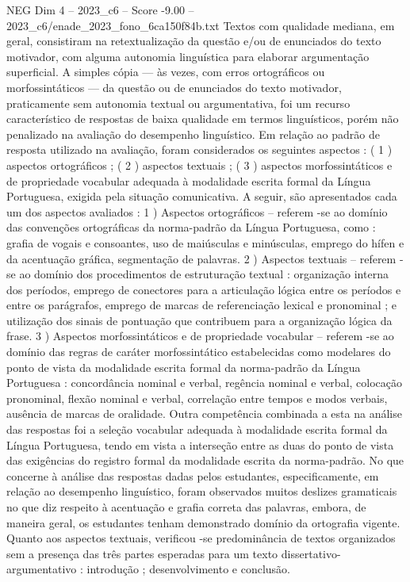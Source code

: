 \begin{textsample}{NEG Dim 4 – 2023\_c6 – Score -9.00 – 2023\_c6/enade\_2023\_fono\_6ca150f84b.txt}
Textos com qualidade mediana, em geral, consistiram na retextualização da questão e/ou de enunciados do texto motivador, com alguma autonomia linguística para elaborar argumentação superficial.
A simples cópia — às vezes, com erros ortográficos ou morfossintáticos — da questão ou de enunciados do texto motivador, praticamente sem autonomia textual ou argumentativa, foi um recurso característico de respostas de baixa qualidade em termos linguísticos, porém não penalizado na avaliação do desempenho linguístico.
Em relação ao padrão de resposta utilizado na avaliação, foram considerados os seguintes aspectos : ( 1 ) aspectos ortográficos ; ( 2 ) aspectos textuais ; ( 3 ) aspectos morfossintáticos e de propriedade vocabular adequada à modalidade escrita formal da Língua Portuguesa, exigida pela situação comunicativa.
A seguir, são apresentados cada um dos aspectos avaliados : 1 ) Aspectos ortográficos – referem -se ao domínio das convenções ortográficas da norma-padrão da Língua Portuguesa, como : grafia de vogais e consoantes, uso de maiúsculas e minúsculas, emprego do hífen e da acentuação gráfica, segmentação de palavras. 2 ) Aspectos textuais – referem -se ao domínio dos procedimentos de estruturação textual : organização interna dos períodos, emprego de conectores para a articulação lógica entre os períodos e entre os parágrafos, emprego de marcas de referenciação lexical e pronominal ; e utilização dos sinais de pontuação que contribuem para a organização lógica da frase. 3 ) Aspectos morfossintáticos e de propriedade vocabular – referem -se ao domínio das regras de caráter morfossintático estabelecidas como modelares do ponto de vista da modalidade escrita formal da norma-padrão da Língua Portuguesa : concordância nominal e verbal, regência nominal e verbal, colocação pronominal, flexão nominal e verbal, correlação entre tempos e modos verbais, ausência de marcas de oralidade.
Outra competência combinada a esta na análise das respostas foi a seleção vocabular adequada à modalidade escrita formal da Língua Portuguesa, tendo em vista a interseção entre as duas do ponto de vista das exigências do registro formal da modalidade escrita da norma-padrão.
No que concerne à análise das respostas dadas pelos estudantes, especificamente, em relação ao desempenho linguístico, foram observados muitos deslizes gramaticais no que diz respeito à acentuação e grafia correta das palavras, embora, de maneira geral, os estudantes tenham demonstrado domínio da ortografia vigente.
Quanto aos aspectos textuais, verificou -se predominância de textos organizados sem a presença das três partes esperadas para um texto dissertativo-argumentativo : introdução ; desenvolvimento e conclusão.

\end{textsample}
